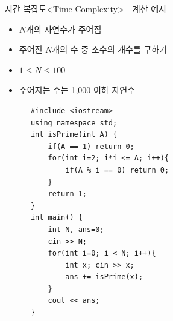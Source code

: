 \begin{frame}[fragile]{시간 복잡도}{<Time Complexity> - 계산 예시}
  \begin{center}
  \end{center}
  \vspace{2mm}
  \begin{twocol}
    \begin{itemize}
      \item $N$개의 자연수가 주어짐
      \item 주어진 $N$개의 수 중 소수의 개수를 구하기
    \end{itemize}
    \vspace{3mm}
    \begin{itemize}
      \item $1 \le N \le 100$
      \item 주어지는 수는 1,000 이하 자연수
    \end{itemize}
  \colsplit
    \begin{verbatim}
      #include <iostream>
      using namespace std;
      int isPrime(int A) {
          if(A == 1) return 0;
          for(int i=2; i*i <= A; i++){
              if(A % i == 0) return 0;
          }
          return 1;
      }
      int main() {
          int N, ans=0;
          cin >> N;
          for(int i=0; i < N; i++){
              int x; cin >> x;
              ans += isPrime(x);
          }
          cout << ans;
      }
    \end{verbatim}
  \end{twocol}
\end{frame}

